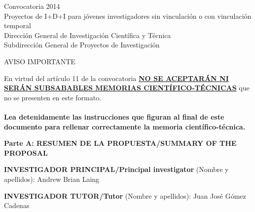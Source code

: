 \documentclass[a4paper,11pt,oneside]{article}
\begin{document}


\begin{tcolorbox}[colback=white,arc=0pt,outer arc=0pt,colframe=black,boxrule=0.6pt]
  \begin{center}
    Convocatoria 2014\\
    Proyectos de I+D+I para j\'ovenes investigadores sin vinculaci\'on o con vinculaci\'on temporal\\
    Direcci\'on General de Investigaci\'on Cient\'ifica y T\'ecnica\\
    Subdirecci\'on General de Proyectos de Investigaci\'on
  \end{center}
\end{tcolorbox}
\begin{tcolorbox}[colback=yellow,arc=0pt,outer arc=0pt,colframe=black,boxrule=0.6pt,left=0mm,right=0mm]
  \begin{center}
    AVISO IMPORTANTE\\
  \end{center}
    En virtud del art\'iculo 11 de la convocatoria \ul{\textbf{NO SE ACEPTAR\'AN NI SER\'AN SUBSABABLES MEMORIAS CIENT\'IFICO-T\'ECNICAS}} que no se presenten en este formato.\\
    \\
    \textbf{Lea detenidamente las instrucciones que figuran al final de este documento para rellenar correctamente la memoria cient\'ifico-t\'ecnica.}
    \\
\end{tcolorbox}
\vspace{3pt}
\begin{tcolorbox}[colback=yellow,arc=0pt,outer arc=0pt,colframe=black,boxrule=0.6pt,left=0mm]
  \textbf{Parte A: RESUMEN DE LA PROPUESTA/SUMMARY OF THE PROPOSAL}
\end{tcolorbox}

\vspace{12pt}

\noindent\textbf{INVESTIGADOR PRINCIPAL/Principal investigator} (Nombre y apellidos): Andrew Brian Laing\\
\vspace{12pt}

\noindent\textbf{INVESTIGADOR TUTOR/Tutor} (Nombre y apellidos): Juan Jos\'e G\'omez Cadenas\\
\vspace{24pt}
\end{document}
